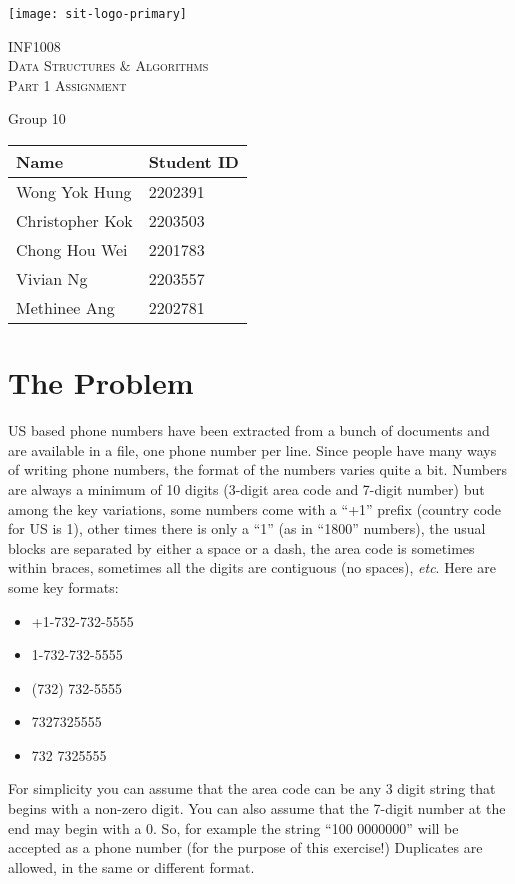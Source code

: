 \documentclass{report}
\begin{document}
\begin{titlepage}
	\centering
	\texttt{[image: sit-logo-primary]}\par\vspace{1cm}
	{\scshape\Huge{INF1008}\\Data Structures \& Algorithms\\\Large{Part 1 Assignment}\par}
	\vspace{1cm}
	{\huge{Group 10}\par}
	\vspace{0.5cm}
	\begin{table}[H]
		\large
		\centering\begin{tabular}{ll}
			\toprule
			Name & Student ID\\
			\midrule
			Wong Yok Hung & 2202391\\
			Christopher Kok & 2203503\\
			Chong Hou Wei & 2201783\\
			Vivian Ng & 2203557\\
			Methinee Ang & 2202781\\
			\bottomrule
		\end{tabular}
	\end{table}
	\vfill
\end{titlepage}
\newpage%
\tableofcontents
\listoffigures
\pagebreak
\chapter*{The Problem}
US based phone numbers have been extracted from a bunch of documents and are available in a file, one phone number per line. Since people have many ways of writing phone numbers, the format of the numbers varies quite a bit. Numbers are always a minimum of 10 digits (3-digit area code and 7-digit number) but among the key variations, some numbers come with a ``+1'' prefix (country code for US is 1), other times there is only a ``1'' (as in ``1800'' numbers), the usual blocks are separated by either a space or a dash, the area code is sometimes within braces, sometimes all the digits are contiguous (no spaces), \emph{etc}. Here are some key formats:
\begin{itemize}
	\item +1-732-732-5555
	\item 1-732-732-5555
	\item (732) 732-5555
	\item 7327325555
	\item 732 7325555
\end{itemize}
For simplicity you can assume that the area code can be any 3 digit string that begins with a non-zero digit. You can also assume that the 7-digit number at the end may begin with a 0. So, for example the string ``100 0000000'' will be accepted as a phone number (for the purpose of this exercise!) Duplicates are allowed, in the same or different format.
\end{document}
